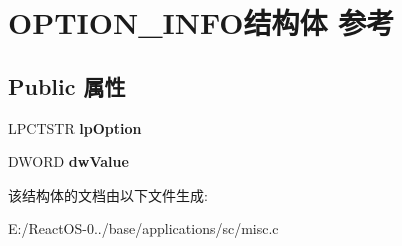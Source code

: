 \hypertarget{struct_o_p_t_i_o_n___i_n_f_o}{}\section{O\+P\+T\+I\+O\+N\+\_\+\+I\+N\+F\+O结构体 参考}
\label{struct_o_p_t_i_o_n___i_n_f_o}
\subsection*{Public 属性}
\begin{DoxyCompactItemize}
\item 
\mbox{\label{struct_o_p_t_i_o_n___i_n_f_o_a213c2a75d85c6da8b0d95a6acb4da9f3}} 
L\+P\+C\+T\+S\+TR {\bfseries lp\+Option}
\item 
\mbox{\label{struct_o_p_t_i_o_n___i_n_f_o_a42e4b636d514c54d581be9185209812b}} 
D\+W\+O\+RD {\bfseries dw\+Value}
\end{DoxyCompactItemize}


该结构体的文档由以下文件生成\+:\begin{DoxyCompactItemize}
\item 
E\+:/\+React\+O\+S-\/0../base/applications/sc/misc.\+c\end{DoxyCompactItemize}
